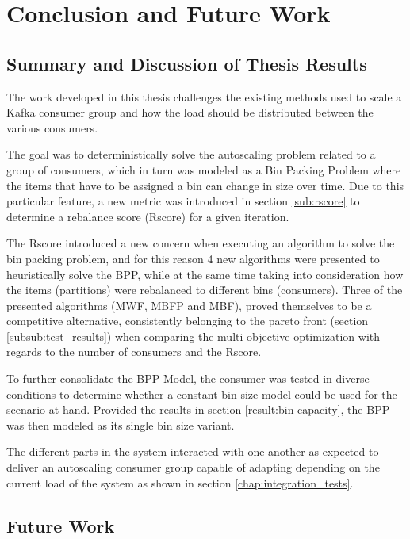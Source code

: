 \chapter{Conclusion and Future Work} 
\label{chap:conclusions}

\section{Summary and Discussion of Thesis Results}

The work developed in this thesis challenges the existing methods used to scale
a Kafka consumer group and how the load should be distributed between the
various consumers.

The goal was to deterministically solve the autoscaling problem related to a
group of consumers, which in turn was modeled as a Bin Packing Problem where the
items that have to be assigned a bin can change in size over time. Due to this
particular feature, a new metric was introduced in section \ref{sub:rscore} to
determine a rebalance score (Rscore) for a given iteration. 

The Rscore introduced a new concern when executing an algorithm to solve the bin
packing problem, and for this reason 4 new algorithms were presented to
heuristically solve the BPP, while at the same time taking into consideration
how the items (partitions) were rebalanced to different bins (consumers). Three
of the presented algorithms (MWF, MBFP and MBF), proved themselves to be a
competitive alternative, consistently belonging to the pareto front (section
\ref{subsub:test_results}) when comparing the multi-objective optimization with
regards to the number of consumers and the Rscore.

To further consolidate the BPP Model, the consumer was tested in diverse
conditions to determine whether a constant bin size model could be used for the
scenario at hand. Provided the results in section \ref{result:bin capacity}, the BPP was
then modeled as its single bin size variant.

The different parts in the system interacted with one another as expected to
deliver an autoscaling consumer group capable of adapting depending on the
current load of the system as shown in section \ref{chap:integration_tests}.

\section{Future Work}

